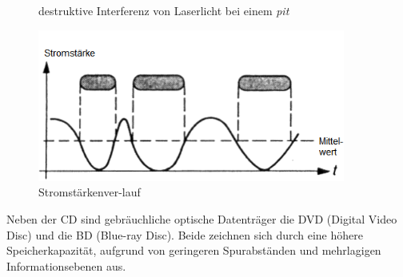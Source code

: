 \begin{figure}[h]
\begin{center}
\begin{minipage}[t]{0.3\textwidth}
\begin{center}
                \caption[destruktive Interferenz von Laserlicht bei einem \textit{pit} \newline \url{http://www.muenster.de/~asshoff/physik/cd/image50.gif} (zuletzt aufgerufen am 07.08.2015)]{destruktive Interferenz von Laserlicht bei einem \textit{pit}}
                \label{fig:cdlaser}
            \end{center}
        \end{minipage}
        \hspace{0.025\textwidth}
        \begin{minipage}[t]{0.3\textwidth}
            \begin{center}
                \includegraphics[width=0.9\textwidth]{Bilder/Optische_Datentraeger_Die_Compact_Disc/Funktionsweise/cdstrom.png}
                \caption[Stromstärkenverlauf \newline \url{http://www.muenster.de/~asshoff/physik/cd/image51.gif} (zuletzt aufgerufen am 07.08.2015)]{Stromstärkenver-lauf}
                \label{fig:cdstrom}
            \end{center}
        \end{minipage}
    \end{center}
\end{figure}

Neben der CD sind gebräuchliche optische Datenträger die DVD (Digital Video
Disc) und die BD (Blue-ray Disc). Beide zeichnen sich durch eine höhere
Speicherkapazität, aufgrund von geringeren Spurabständen und mehrlagigen
Informationsebenen aus.
